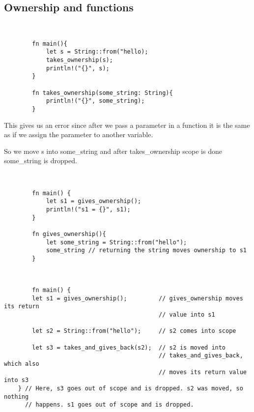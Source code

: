 \subsection{Ownership and functions}
\begin{example}

    \

    \begin{lstlisting}
        fn main(){
            let s = String::from("hello);
            takes_ownership(s);
            println!("{}", s);
        }

        fn takes_ownership(some_string: String){
            println!("{}", some_string);
        }
    \end{lstlisting}

This gives us an error since after we pass a parameter in a function it is the same as if we assign the parameter to another variable.

So we move s into some\_string and after takes\_ownership scope is done some\_string is dropped.

\begin{example}
    
    \

    \begin{lstlisting}
        fn main() {
            let s1 = gives_ownership();
            println!("s1 = {}", s1);
        }

        fn gives_ownership(){
            let some_string = String::from("hello");
            some_string // returning the string moves ownership to s1
        }
    \end{lstlisting}
\end{example}
\begin{example}
    
    \

    \begin{lstlisting}
        fn main() {
        let s1 = gives_ownership();         // gives_ownership moves its return
                                            // value into s1
    
        let s2 = String::from("hello");     // s2 comes into scope
    
        let s3 = takes_and_gives_back(s2);  // s2 is moved into
                                            // takes_and_gives_back, which also
                                            // moves its return value into s3
    } // Here, s3 goes out of scope and is dropped. s2 was moved, so nothing
      // happens. s1 goes out of scope and is dropped.
    

\end{lstlisting}
\end{example}
\end{example}
